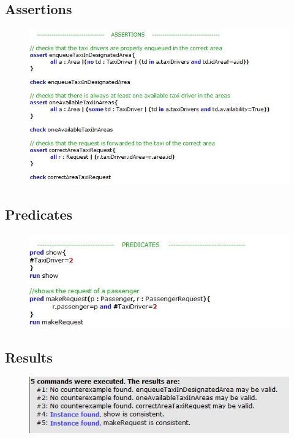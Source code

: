 \documentclass[18pt,oneside,a4paper, titlepage]{article}
\begin{document}
	\subsection{Assertions}
	\begin{figure}[h]
		\includegraphics[scale=0.8]{Alloy/assertions.jpg}
	\end{figure}
	
	\subsection{Predicates}
		\begin{figure}[h]
			\includegraphics[scale=0.8]{Alloy/predicates.jpg}
		\end{figure}
\newpage
	\subsection{Results}
		\begin{figure}[h]
			\includegraphics[scale=1]{Alloy/results.jpg}
		\end{figure}
\newpage
\end{document}
